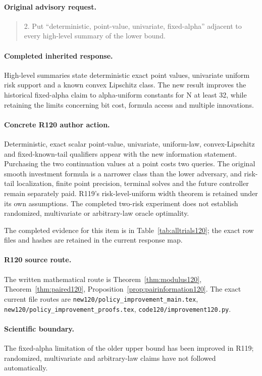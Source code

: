 \paragraph{Original advisory request.}
\begin{quote}
2. Put “deterministic, point-value, univariate, fixed-alpha” adjacent to every high-level summary of the lower bound.
\end{quote}
\paragraph{Completed inherited response.}
High-level summaries state deterministic exact point values, univariate uniform risk support and a known convex Lipschitz class. The new result improves the historical fixed-alpha claim to alpha-uniform constants for N at least 32, while retaining the limits concerning bit cost, formula access and multiple innovations.
\paragraph{Concrete R120 author action.}
Deterministic, exact scalar point-value, univariate, uniform-law, convex-Lipschitz and fixed-known-tail qualifiers appear with the new information statement. Purchasing the two continuation values at a point costs two queries. The original smooth investment formula is a narrower class than the lower adversary, and risk-tail localization, finite point precision, terminal solves and the future controller remain separately paid. R119's risk-level-uniform width theorem is retained under its own assumptions. The completed two-risk experiment does not establish randomized, multivariate or arbitrary-law oracle optimality.

The completed evidence for this item is in Table~\ref{tab:alltrials120}; the exact row files and hashes are retained in the current response map.
\paragraph{R120 source route.}
The written mathematical route is Theorem~\ref{thm:modulus120}, Theorem~\ref{thm:paired120}, Proposition~\ref{prop:pairinformation120}. The exact current file routes are \nolinkurl{new120/policy_improvement_main.tex}, \nolinkurl{new120/policy_improvement_proofs.tex}, \nolinkurl{code120/improvement120.py}.
\paragraph{Scientific boundary.}
The fixed-alpha limitation of the older upper bound has been improved in R119; randomized, multivariate and arbitrary-law claims have not followed automatically.

